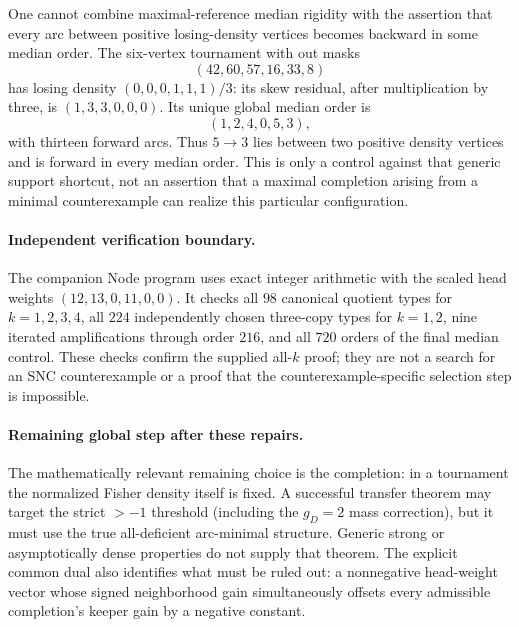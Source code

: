 One cannot combine maximal-reference median rigidity with the assertion
that every arc between positive losing-density vertices becomes backward
in some median order. The six-vertex tournament with out masks
\[
 (42,60,57,16,33,8)
\]
has losing density $(0,0,0,1,1,1)/3$: its skew residual, after
multiplication by three, is $(1,3,3,0,0,0)$. Its unique global median
order is
\[
 (1,2,4,0,5,3),
\]
with thirteen forward arcs. Thus $5\to3$ lies between two positive
density vertices and is forward in every median order. This is only
a control against that generic support shortcut, not an assertion
that a maximal completion arising from a minimal counterexample can
realize this particular configuration.

\paragraph{Independent verification boundary.}
The companion Node program
 uses exact integer
arithmetic with the scaled head weights $(12,13,0,11,0,0)$.
It checks all $98$ canonical quotient types for $k=1,2,3,4$, all $224$
independently chosen three-copy types for $k=1,2$, nine iterated
amplifications through order $216$, and all $720$ orders of the final
median control. These checks confirm the supplied all-$k$ proof;
they are not a search for an SNC counterexample or a proof that the
counterexample-specific selection step is impossible.

\paragraph{Remaining global step after these repairs.}
The mathematically relevant remaining choice is the completion: in a
tournament the normalized Fisher density itself is fixed. A successful
transfer theorem may target the strict $>-1$ threshold (including
the $g_D=2$ mass correction), but it must use the true all-deficient
arc-minimal structure. Generic strong or asymptotically dense properties
do not supply that theorem. The explicit common dual also identifies
what must be ruled out: a nonnegative head-weight vector whose signed
neighborhood gain simultaneously offsets every admissible completion's
keeper gain by a negative constant.
